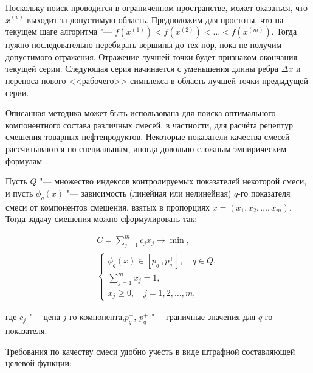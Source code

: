 Поскольку поиск проводится в ограниченном пространстве, может оказаться, что $\breve{x}^{(v)}$ выходит за допустимую область. Предположим для простоты, что на текущем шаге алгоритма "--- $f(x^{(1)})<f(x^{(2)})<\dots<f(x^{(m)})$. Тогда нужно последовательно перебирать вершины до тех пор, пока не получим допустимого отражения. Отражение лучшей точки будет признаком окончания текущей серии. Следующая серия начинается с уменьшения длины ребра $\Delta x$ и переноса нового <<рабочего>> симплекса в область лучшей точки предыдущей серии. 



Описанная методика может быть использована для поиска оптимального компонентного состава различных смесей, в частности, для расчёта рецептур смешения товарных нефтепродуктов. Некоторые показатели качества смесей рассчитываются по специальным, иногда довольно сложным эмпирическим формулам \cite{liv:bib:19, liv:bib:20}. 



Пусть $Q$ "--- множество индексов контролируемых показателей некоторой смеси, и пусть $\phi_q(x)$ "--- зависимость (линейная или нелинейная) $q$-го показателя смеси от компонентов смешения, взятых в пропорциях $x=(x_1,x_2,\dots,x_m)$. Тогда задачу смешения можно сформулировать так:

\begin{gather*}

C=\sum\limits_{j=1}^m{c_jx_j}\to\min,

\\

\left\{

\begin{array}{l}

\phi_q(x)\in[p_q^-,p_q^+],\quad q\in Q,\\

\sum\limits_{j=1}^m{x_j=1,} \\

x_j\ge0,\quad j=1,2,\dots,m,

\end{array}\right.

\end{gather*}

где $c_j$ "--- цена $j$-го компонента,$p_q^-$, $p_q^+$ "--- граничные значения для $q$-го показателя.



Требования по качеству смеси удобно учесть в виде штрафной составляющей целевой функции: 

